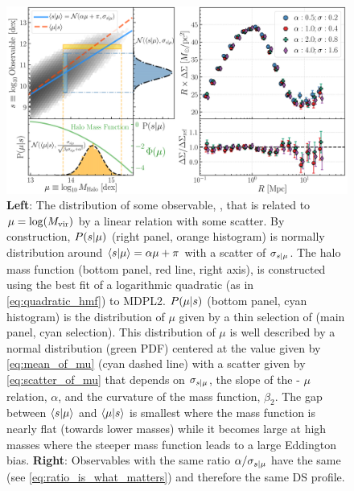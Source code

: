 \documentclass[a4paper,fleqn,usenatbib]{mnras}
\begin{document}
\begin{figure}
  \includegraphics[width=\textwidth]{figure/theory.png}
  \caption{
  	  \textbf{Left}:
      The distribution of some observable, \obsSym{}, that is related to $\mu = \log(M_{\rm vir})$ by a linear relation with some scatter.
      By construction, $P(s | \mu)$ (right panel, orange histogram) is normally distribution around $\langle s | \mu \rangle = \alpha \mu + \pi$ with a scatter of $\sigma_{s | \mu}$.
      The halo mass function (bottom panel, red line, right axis), is constructed using the best fit of a logarithmic quadratic (as in \ref{eq:quadratic_hmf}) to MDPL2.
      $P(\mu | s)$ (bottom panel, cyan histogram) is the distribution of $\mu$ given by a thin selection of \obsSym{} (main panel, cyan selection).
      This distribution of $\mu$ is well described by a normal distribution (green PDF) centered at the value given by \ref{eq:mean_of_mu} (cyan dashed line) with a scatter given by \ref{eq:scatter_of_mu} that depends on $\sigma_{s | \mu}$, the slope of the \obsSym - $\mu$ relation, $\alpha$, and the curvature of the mass function, $\beta_2$.
      The gap between $\langle s | \mu \rangle$ and $\langle \mu | s \rangle$ is smallest where the mass function is nearly flat (towards lower masses) while it becomes large at high masses where the steeper mass function leads to a large Eddington bias.
	  \textbf{Right}:
	  Observables with the same ratio $\alpha / \sigma_{s{} | \mu{}}$ have the same \scatterMhaloObsSym{} (see \ref{eq:ratio_is_what_matters}) and therefore the same DS profile.
	}
    \label{fig:theory}
\end{figure}
\end{document}
